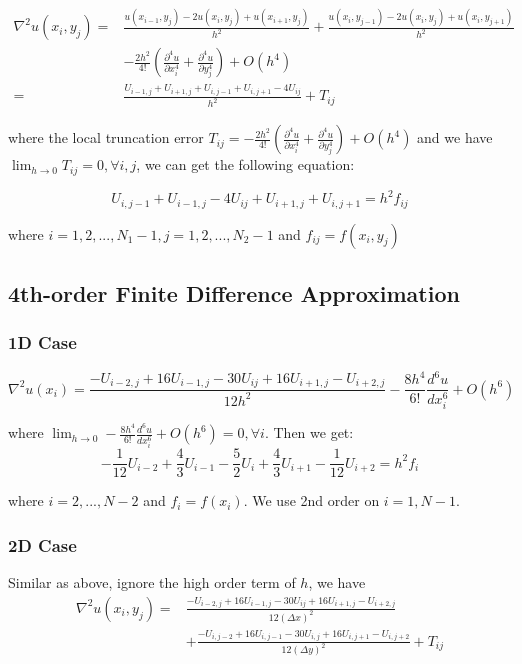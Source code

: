 \documentclass[a4paper]{article}
\begin{document}
\begin{equation}
    \begin{split}
    \nabla^2u(x_i, y_j) = & \frac{u(x_{i-1},y_j) - 2u(x_i,y_j) + u(x_{i+1},y_j)}{h^2} + \frac{u(x_i,y_{j-1}) - 2u(x_i,y_j) + u(x_i,y_{j+1})}{h^2} \\
    & -\frac{2h^2}{4!}(\frac{\partial^4 u}{\partial x_i^4} + \frac{\partial^4 u}{\partial y_j^4}) + O(h^4)\\ 
    = & \frac{U_{i-1,j} + U_{i+1,j} + U_{i,j-1} + U_{i,j+1} - 4U_{ij} }{h^2} + T_{ij}
    \end{split}
\end{equation}

where the local truncation error $T_{ij} = -\frac{2h^2}{4!}(\frac{\partial^4 u}{\partial x_i^4} + \frac{\partial^4 u}{\partial y_j^4}) + O(h^4)$ and we have $\lim_{h\rightarrow 0} T_{ij} = 0, \forall i,j$, we can get the following equation:

\begin{equation}
    U_{i,j-1} + U_{i-1,j} - 4U_{ij} + U_{i+1,j} + U_{i,j+1}   = h^2 f_{ij}
\end{equation}

where $ i = 1,2,...,N_1-1, j = 1,2,...,N_2-1$ and $f_{ij} = f(x_i,y_j)$

\subsection{4th-order Finite Difference Approximation}

\subsubsection{1D Case}
\begin{equation}
    \nabla^2 u(x_i) = \frac{-U_{i-2,j} + 16U_{i-1,j} - 30U_{ij} + 16 U_{i+1,j} - U_{i+2,j}}{12h^2} -\frac{8h^4}{6!}\frac{d^6 u}{d x_i^6}  + O(h^6)
\end{equation}

where $\lim_{h\rightarrow 0} -\frac{8h^4}{6!}\frac{d^6 u}{d x_i^6}  + O(h^6) = 0, \forall i$. Then we get:
\begin{equation}
     -\frac{1}{12}U_{i-2} + \frac{4}{3}U_{i-1} - \frac{5}{2}U_{i} + \frac{4}{3}U_{i+1} - \frac{1}{12}U_{i+2} = h^2 f_{i}
\end{equation}

where $ i = 2,...,N-2$ and $f_{i} = f(x_i)$. We use 2nd order on $i=1, N-1$.

\subsubsection{2D Case}
Similar as above, ignore the high order term of $h$, we have 
\begin{equation}
    \begin{split}
    \nabla^2 u(x_i, y_j) =  & \frac{-U_{i-2,j} + 16U_{i-1,j} - 30U_{ij} + 16 U_{i+1,j} - U_{i+2,j}}{12(\Delta x)^2}\\
    & + \frac{-U_{i,j-2} + 16 U_{i,j-1} - 30 U_{i,j} + 16U_{i,j+1} -U_{i, j+2} }{12(\Delta y)^2}  + T_{ij}
    \end{split}
\end{equation}
\end{document}
